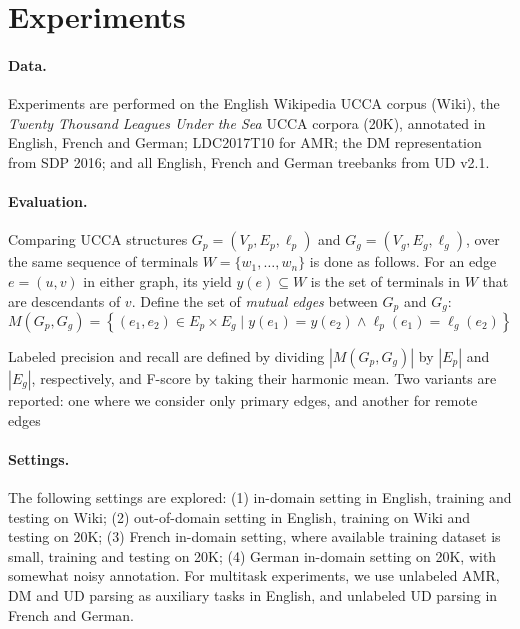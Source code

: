 \documentclass[12pt]{article}
\begin{document}
\section{Experiments}\label{sec:experiments}

\paragraph{Data.}

Experiments are performed on the English Wikipedia UCCA corpus (Wiki),
the \textit{Twenty Thousand Leagues Under the Sea} UCCA corpora (20K),
annotated in English, French and German;
LDC2017T10 for AMR;
the DM representation from SDP 2016;
and all English, French and German treebanks from UD v2.1.


\paragraph{Evaluation.}
Comparing UCCA structures
$G_p=(V_p,E_p,\ell_p)$ and $G_g=(V_g,E_g,\ell_g)$,
over the same sequence of terminals $W = \{w_1,\ldots,w_n\}$
is done as follows.
For an edge $e=(u,v)$ in either graph, its yield $y(e) \subseteq W$ is the
set of terminals in $W$ that are descendants of $v$.
Define the set of \textit{mutual edges} between $G_p$ and $G_g$:
\[
    M(G_p,G_g) =
    \left\{(e_1,e_2) \in E_p \times E_g \;|\;
    y(e_1) = y(e_2) \wedge \ell_p(e_1)=\ell_g(e_2)\right\}
\]

Labeled precision and recall are defined by dividing $|M(G_p,G_g)|$ by $|E_p|$ and $|E_g|$, respectively,
and F-score by taking their harmonic mean.
Two variants are reported: one where we consider only primary edges,
and another for remote edges


\paragraph{Settings.}

The following settings are explored:
(1) in-domain setting in English, training and testing on Wiki;
(2) out-of-domain setting in English, training on Wiki and testing on 20K;
(3) French in-domain setting, where available training dataset is small,
training and testing on 20K;
(4) German in-domain setting on 20K, with somewhat noisy annotation.
For multitask experiments, we use unlabeled AMR, DM and UD parsing as auxiliary tasks in English,
and unlabeled UD parsing in French and German.
\end{document}
